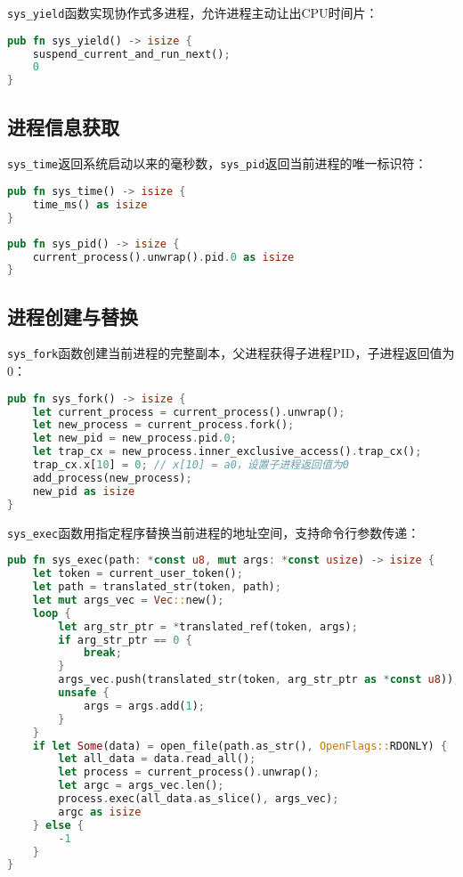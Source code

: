 \texttt{sys\_yield}函数实现协作式多进程，允许进程主动让出CPU时间片：

\begin{lstlisting}[language=Rust,caption={进程让权系统调用}, label={lst:sys-yield}]
pub fn sys_yield() -> isize {
    suspend_current_and_run_next();
    0
}
\end{lstlisting}

\subsection{进程信息获取}

\texttt{sys\_time}返回系统启动以来的毫秒数，\texttt{sys\_pid}返回当前进程的唯一标识符：

\begin{lstlisting}[language=Rust,caption={系统时间获取}, label={lst:sys-time}]
pub fn sys_time() -> isize {
    time_ms() as isize
}
\end{lstlisting}

\begin{lstlisting}[language=Rust,caption={进程ID获取}, label={lst:sys-pid}]
pub fn sys_pid() -> isize {
    current_process().unwrap().pid.0 as isize
}
\end{lstlisting}

\subsection{进程创建与替换}

\texttt{sys\_fork}函数创建当前进程的完整副本，父进程获得子进程PID，子进程返回值为0：

\begin{lstlisting}[language=Rust,caption={进程复制系统调用}, label={lst:sys-fork}]
pub fn sys_fork() -> isize {
    let current_process = current_process().unwrap();
    let new_process = current_process.fork();
    let new_pid = new_process.pid.0;
    let trap_cx = new_process.inner_exclusive_access().trap_cx();
    trap_cx.x[10] = 0; // x[10] = a0，设置子进程返回值为0
    add_process(new_process);
    new_pid as isize
}
\end{lstlisting}

\texttt{sys\_exec}函数用指定程序替换当前进程的地址空间，支持命令行参数传递：

\begin{lstlisting}[language=Rust,caption={程序执行系统调用}, label={lst:sys-exec}]
pub fn sys_exec(path: *const u8, mut args: *const usize) -> isize {
    let token = current_user_token();
    let path = translated_str(token, path);
    let mut args_vec = Vec::new();
    loop {
        let arg_str_ptr = *translated_ref(token, args);
        if arg_str_ptr == 0 {
            break;
        }
        args_vec.push(translated_str(token, arg_str_ptr as *const u8));
        unsafe {
            args = args.add(1);
        }
    }
    if let Some(data) = open_file(path.as_str(), OpenFlags::RDONLY) {
        let all_data = data.read_all();
        let process = current_process().unwrap();
        let argc = args_vec.len();
        process.exec(all_data.as_slice(), args_vec);
        argc as isize
    } else {
        -1
    }
}
\end{lstlisting}


